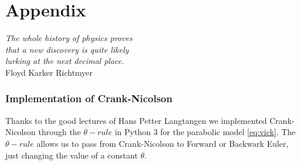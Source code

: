 
\part*{Appendix}
\noindent \begin{flushright}
\textit{The whole history of physics proves}\\
\textit{ that a new discovery is quite likely}\\
\textit{ lurking at the next decimal place.}\\
Floyd Karker Richtmyer
\par\end{flushright}

\section*{Implementation of Crank-Nicolson }

Thanks to the good lectures of Hans Petter Langtangen \cite{langtangen_finite_nodate}
we implemented Crank-Nicolson through the $\theta-rule$ in Python
3 for the parabolic model \ref{eq:vick}. The $\theta-rule$ allows
us to pass from Crank-Nicolson to Forward or Backwark Euler, just
changing the value of a constant $\theta$. 

